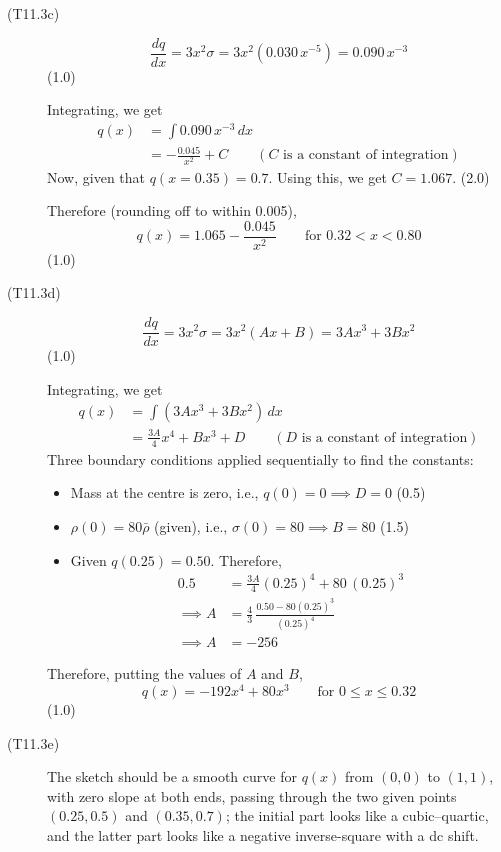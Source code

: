 \begin{description}
\item[(T11.3c)]
  \[
    \frac{dq}{dx} = 3x^2\sigma = 3x^2(0.030\,x^{-5}) = 0.090\,x^{-3}
  \]
  \hfill(1.0)

  Integrating, we get
  \begin{align*}
    q(x) &= \int 0.090\,x^{-3}\,dx
      \tag*{(1.0)}\\
      &= -\frac{0.045}{x^2} + C
      \qquad (C \text{ is a constant of integration})
      \tag*{(1.0)}
  \end{align*}
  Now, given that $q(x = 0.35) = 0.7$. Using this, we get $C = 1.067$.
  \hfill(2.0)

  Therefore (rounding off to within 0.005),
  \[
    q(x) = 1.065 - \frac{0.045}{x^2}
    \qquad \text{for } 0.32 < x < 0.80
  \]
  \hfill(1.0)

\item[(T11.3d)]
  \[
    \frac{dq}{dx} = 3x^2\sigma = 3x^2(Ax + B) = 3Ax^3 + 3Bx^2
  \]
  \hfill(1.0)

  Integrating, we get
  \begin{align*}
    q(x) &= \int (3Ax^3 + 3Bx^2)\,dx
      \tag*{(1.0)}\\
      &= \frac{3A}{4}x^4 + Bx^3 + D
      \qquad (D \text{ is a constant of integration})
      \tag*{(1.0)}
  \end{align*}
  Three boundary conditions applied sequentially to find the constants:
  \begin{itemize}
  \item Mass at the centre is zero, i.e., $q(0) = 0 \implies D = 0$
    \hfill(0.5)
  \item $\rho(0) = 80\bar{\rho}$ (given), i.e.,
    $\sigma(0) = 80 \implies B = 80$ \hfill(1.5)
  \item Given $q(0.25) = 0.50$. Therefore,
    \begin{align*}
      0.5 &= \frac{3A}{4}(0.25)^4 + 80\,(0.25)^3\\
      \implies A &= \frac{4}{3}\,\frac{0.50 - 80(0.25)^3}{(0.25)^4}\\
      \implies A &= -256
      \tag*{(2.0)}
    \end{align*}
  \end{itemize}
  Therefore, putting the values of $A$ and $B$,
  \[
    q(x) = -192 x^4 + 80 x^3 \qquad \text{for } 0 \le x \le 0.32
  \]
  \hfill(1.0)

\item[(T11.3e)] The sketch should be a smooth curve for $q(x)$ from $(0,0)$
  to $(1,1)$, with zero slope at both ends, passing through the two given
  points $(0.25, 0.5)$ and $(0.35, 0.7)$; the initial part looks like a
  cubic--quartic, and the latter part looks like a negative inverse-square
  with a dc shift.
\end{description}

